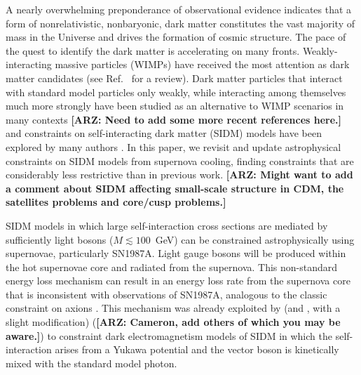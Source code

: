 \documentclass[nofootinbib,prd,superscriptaddress,twocolumn]{revtex4}
\newcommand{\arz}[1]{{{\bf{\color{BrickRed}[ARZ: #1]}}}}
\begin{document}
A nearly overwhelming preponderance of observational evidence indicates that a form of nonrelativistic, nonbaryonic, 
dark matter constitutes the vast majority of mass in the Universe and drives the formation of cosmic structure. 
The pace of the quest to identify the dark matter is accelerating on many fronts. Weakly-interacting massive 
particles (WIMPs) have received the most attention as dark matter candidates (see Ref.~\cite{jungman_etal96} for a review). 
Dark matter particles that interact with standard model particles only weakly, while interacting among themselves 
much more strongly have been studied as an alternative to WIMP scenarios in many contexts 
\cite{carlson_etal92,deLaix_etal95,atrio-barandela_davidson97,spergel_steinhardt00,hogan_dalcanton00,mohapatra_teplitz00,
dave_etal01,hisano_etal04,hisano_etal05,pospelov_etal08,arkani-hamed_etal08a,lattanzi_silk08,ackerman_etal09,feng_etal09,
kong_etal15} \arz{Need to add some more recent references here.} 
and constraints on self-interacting dark matter (SIDM) models have been explored by many authors \cite{yoshida_etal00,gnedin_ostriker01,miralda-escude02,randall_etal08,kamionkowski_profumo08,zentner09,robertson_zentner09,pieri_etal09,spolyar_etal09,finkbeiner_etal09,
slatyer_etal09,bramante_etal14,albuquerque_etal14,kaplinghat_etal14,chen_etal14,feng_etal16,catena_widmark16}.
In this paper, we revisit and update astrophysical constraints on SIDM models from 
supernova cooling, finding constraints that are considerably less restrictive than in 
previous work. 
\arz{Might want to add a comment about SIDM affecting small-scale structure in CDM, the satellites problems and core/cusp problems.}


SIDM models in which large self-interaction cross sections are mediated by sufficiently light 
bosons ($M \lesssim 100$~GeV) can be constrained astrophysically using supernovae, particularly 
SN1987A. Light gauge bosons will be produced within the hot supernovae core and 
radiated from the supernova. This non-standard energy loss mechanism can result in an energy loss rate 
from the supernova core that is inconsistent with observations of SN1987A, analogous to the 
classic constraint on axions \cite{raffelt96_book}. This mechanism was already exploited by 
\cite{dent_etal12} (and \cite{rrapaj_reddy16}, with a slight modification) (\arz{Cameron, add others of which you may be aware.}) 
to constraint dark electromagnetism models of SIDM in which the self-interaction arises from a Yukawa potential and the 
vector boson is kinetically mixed with the standard model photon.
\end{document}
